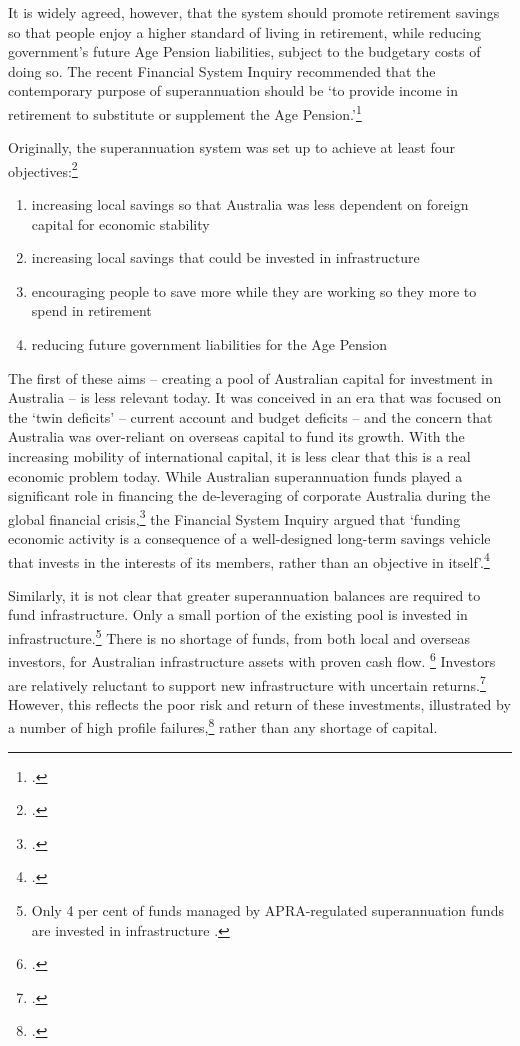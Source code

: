 \documentclass{grattanAlpha}
\begin{document}
It is widely agreed, however, that the system should promote retirement savings so that people enjoy a higher standard of living in retirement, while reducing government’s future Age Pension liabilities, subject to the budgetary costs of doing so. The recent Financial System Inquiry recommended that the contemporary purpose of superannuation should be ‘to provide income in retirement to substitute or supplement the Age Pension.’\footcite[][95]{FinancialSystemsInquiry2015}

 Originally, the superannuation system was set up to achieve at least four objectives:\footcite{Greenwood2010}
 \begin{enumerate}
\item increasing local savings so that Australia was less dependent on foreign capital for economic stability
\item increasing local savings that could be invested in infrastructure
\item encouraging people to save more while they are working so they more to spend in retirement
\item reducing future government liabilities for the Age Pension
 \end{enumerate}
The first of these aims – creating a pool of Australian capital for investment in Australia – is less relevant today. It was conceived in an era that was focused on the ‘twin deficits’ – current account and budget deficits – and the concern that Australia was over-reliant on overseas capital to fund its growth. With the increasing mobility of international capital, it is less clear that this is a real economic problem today. While Australian superannuation funds played a significant role in financing the de-leveraging of corporate Australia during the global financial crisis,\footcites{Henry2009}{RBA2014FinancialSystemInquirySubmission} the Financial System Inquiry argued that ‘funding economic activity is a consequence of a well-designed long-term savings vehicle that invests in the interests of its members, rather than an objective in itself’.\footcite[][98]{FinancialSystemsInquiry2015}

Similarly, it is not clear that greater superannuation balances are required to fund infrastructure. Only a small portion of the existing pool is invested in infrastructure.\footnote{Only 4 per cent of funds managed by APRA-regulated superannuation funds are invested in infrastructure \textcite[][Table~1d]{APRA2015a}.} 
There is no shortage of funds, from both local and overseas investors, for Australian infrastructure assets with proven cash flow.%
\footcite[][188]{ProductivityCommission2013PublicInfrastructure}
Investors are relatively reluctant to support new infrastructure with uncertain returns.\footcite[][131]{ProductivityCommission2013PublicInfrastructure}  However, this reflects the poor risk and return of these investments, illustrated by a number of high profile failures,\footcite[][10]{ElaurantMcDougall2015} rather than any shortage of capital.
\end{document}
